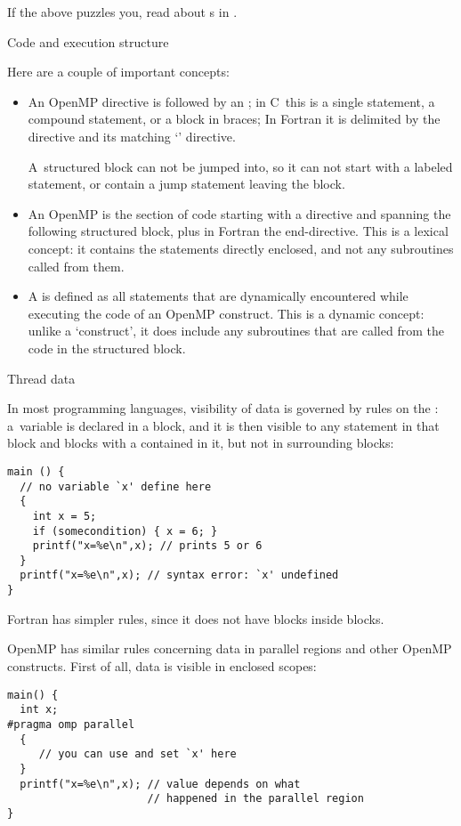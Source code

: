If the above puzzles you, read about s
in .

 {Code and execution structure}
\label{sec:omp-code-structure}

Here are a couple of important concepts:
\begin{itemize}
\item An OpenMP directive is followed by an
  ; in C~this is a single statement, a
  compound statement, or a block in braces; In Fortran it is
  delimited by the directive and its matching `' directive.

  A~structured block can not be jumped into, so it can not start with a
  labeled statement, or contain a jump statement leaving the block.
\item 
 An OpenMP  is the section of code
  starting with a directive and spanning the following structured block,
  plus in Fortran the end-directive. This is a lexical concept: it contains
  the statements directly enclosed, and not any subroutines called from them.
\item
  A  is defined as all statements
  that are dynamically encountered while executing the code of an OpenMP construct.
  This is a dynamic concept: unlike a `construct', it does include any subroutines
  that are called from the code in the structured block.
\end{itemize}

 {Thread data}

In most programming languages, visibility of data
is governed by rules on the :
a~variable is declared in a block, and it is then visible to any
statement in that block and blocks with a 
contained in it, but not in surrounding blocks:
\lstset{language=C}
\begin{lstlisting}
main () {
  // no variable `x' define here
  {
    int x = 5;
    if (somecondition) { x = 6; }
    printf("x=%e\n",x); // prints 5 or 6
  }
  printf("x=%e\n",x); // syntax error: `x' undefined
}
\end{lstlisting}
Fortran has simpler rules, since it does not have blocks inside blocks.

OpenMP has similar rules concerning data in parallel regions
and other OpenMP constructs. First of all, data is visible
in enclosed scopes:
\begin{lstlisting}
main() {
  int x;
#pragma omp parallel
  {
     // you can use and set `x' here
  }
  printf("x=%e\n",x); // value depends on what
                      // happened in the parallel region
}
\end{lstlisting}

